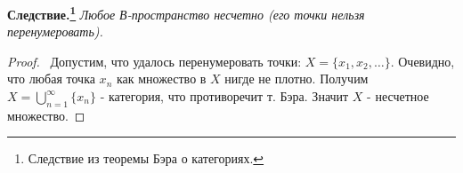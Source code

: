 \noindent\textbf{Следствие.\footnote{Следствие из теоремы Бэра о категориях.}} \textit{Любое В-пространство несчетно (его точки нельзя перенумеровать).}

\begin{proof}
\smallskip
\par\noindent \textbullet~Допустим, что удалось перенумеровать точки: $X = \{ x_1, x_2, \dots \}$. Очевидно, что любая точка $x_n$ как множество в $X$ нигде не плотно.
Получим $X = \bigcup\limits_{n =1}^\infty \{x_n\}$ -  категория, что противоречит т. Бэра. Значит $X$ - несчетное множество.
\end{proof}
